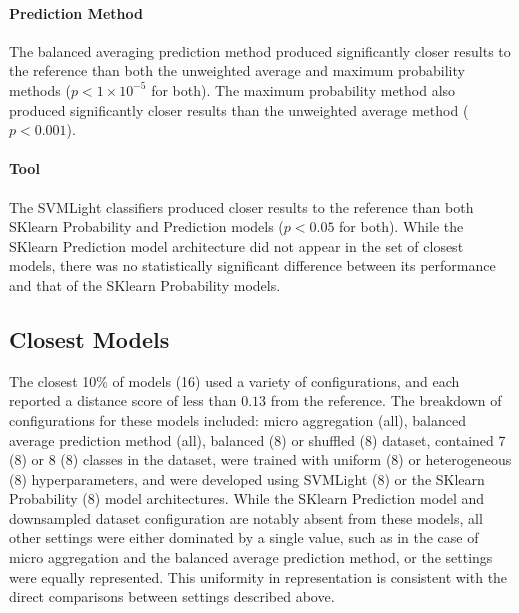 \paragraph{Prediction Method}
The balanced averaging prediction method produced significantly closer results to the reference than both the
unweighted average and maximum probability methods ($p < 1\times 10^{-5}$ for both). The maximum probability method
also produced significantly closer results than the unweighted average method ($p < 0.001$).

\paragraph{Tool}
The SVMLight classifiers produced closer results to the reference than both SKlearn Probability and Prediction models
($p < 0.05$ for both). While the SKlearn Prediction model architecture did not appear in the set of closest models,
there was no statistically significant difference between its performance and that of the SKlearn Probability models.

\subsection{Closest Models}
The closest 10\% of models (16) used a variety of configurations, and each reported a distance score of less than
$0.13$ from the reference. The breakdown of configurations for these models included: micro aggregation (all), balanced
average prediction method (all), balanced (8) or shuffled (8) dataset, contained 7 (8) or 8 (8) classes in the dataset,
were trained with uniform (8) or heterogeneous (8) hyperparameters, and were developed using SVMLight (8) or the
SKlearn Probability (8) model architectures. While the SKlearn Prediction model and downsampled dataset configuration
are notably absent from these models, all other settings were either dominated by a single value, such as in the case
of micro aggregation and the balanced average prediction method, or the settings were equally represented. This
uniformity in representation is consistent with the direct comparisons between settings described above.






